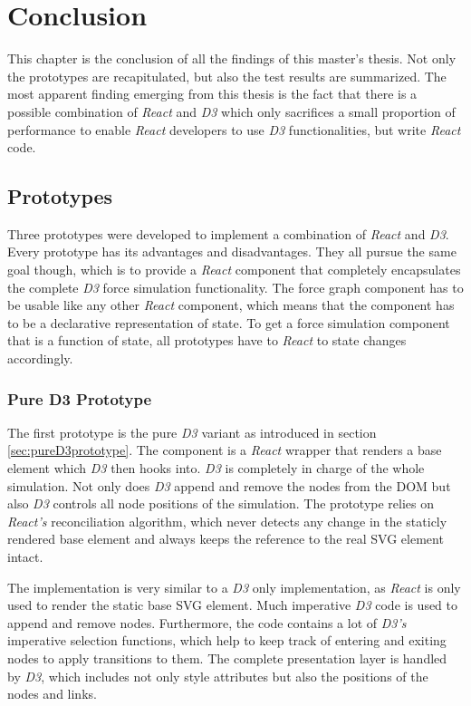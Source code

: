 \chapter{Conclusion}
\label{cha:conclusion}

This chapter is the conclusion of all the findings of this master's thesis. Not only the prototypes are recapitulated, but also the test results are summarized. The most apparent finding emerging from this thesis is the fact that there is a possible combination of \emph{React} and \emph{D3} which only sacrifices a small proportion of performance to enable \emph{React} developers to use \emph{D3} functionalities, but write \emph{React} code.

\section{Prototypes}

Three prototypes were developed to implement a combination of \emph{React} and \emph{D3}. Every prototype has its advantages and disadvantages. They all pursue the same goal though, which is to provide a \emph{React} component that completely encapsulates the complete \emph{D3} force simulation functionality. The force graph component has to be usable like any other \emph{React} component, which means that the component has to be a declarative representation of state. To get a force simulation component that is a function of state, all prototypes have to \emph{React} to state changes accordingly.

\subsection{Pure D3 Prototype}

The first prototype is the pure \emph{D3} variant as introduced in section \ref{sec:pureD3prototype}. The component is a \emph{React} wrapper that renders a base element which \emph{D3} then hooks into. \emph{D3} is completely in charge of the whole simulation. Not only does \emph{D3} append and remove the nodes from the DOM but also \emph{D3} controls all node positions of the simulation. The prototype relies on \emph{React's} reconciliation algorithm, which never detects any change in the staticly rendered base element and always keeps the reference to the real SVG element intact.

The implementation is very similar to a \emph{D3} only implementation, as \emph{React} is only used to render the static base SVG element. Much imperative \emph{D3} code is used to append and remove nodes. Furthermore, the code contains a lot of \emph{D3's} imperative selection functions, which help to keep track of entering and exiting nodes to apply transitions to them. The complete presentation layer is handled by \emph{D3}, which includes not only style attributes but also the positions of the nodes and links.

